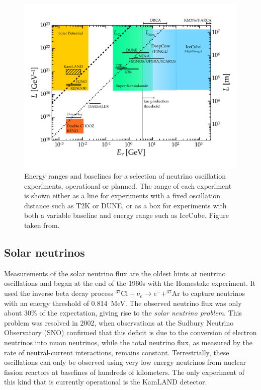 \begin{figure}
    \centering
    \includegraphics{figures/theory/LvsE.pdf}
    \caption{Energy ranges and baselines for a selection of neutrino oscillation experiments, operational or planned.  The range of each experiment is shown either as a line for experiments with a fixed oscillation distance such as T2K or DUNE, or as a box for experiments with both a variable baseline and energy range such as IceCube. Figure taken from\cite{IceCube:2016xxt}.\label{fig:oscillation-experiments-overview}}
\end{figure}

\subsection{Solar neutrinos}
Measurements of the solar neutrino flux are the oldest hints at neutrino oscillations and began at the end of the 1960s with the Homestake\cite{DAVIS199413} experiment.
It used the inverse beta decay process $^{37}\mathrm{Cl}+\nu_e \rightarrow e^- + ^{37}\mathrm{Ar}$ to capture neutrinos with an energy threshold of \SI{0.814}{MeV}.
The observed neutrino flux was only about 30\% of the expectation, giving rise to the \emph{solar neutrino problem}.
This problem was resolved in 2002, when observations at the Sudbury Neutrino Observatory (SNO) confirmed\cite{PhysRevLett.89.011301} that this deficit is due to the conversion of electron neutrinos into muon neutrinos, while the total neutrino flux, as measured by the rate of neutral-current interactions, remains constant.
Terrestrially, these oscillations can only be observed using very low energy neutrinos from nuclear fission reactors at baselines of hundreds of kilometers.
The only experiment of this kind that is currently operational is the KamLAND detector\cite{PhysRevLett.90.021802}.

